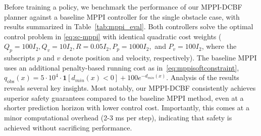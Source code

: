 \documentclass[letterpaper, 10 pt, conference]{ieeeconf}
\begin{document}
Before training a policy, we benchmark the performance of our MPPI-DCBF planner against a baseline MPPI controller for the single obstacle case, with results summarized in Table~\ref{tab:mppi_eval}. Both controllers solve the optimal control problem in \eqref{eq:sc-mppi} with identical quadratic cost weights ($Q_p=100I_2, Q_v=10I_2, R=0.05I_2, P_p=1000I_2,$ and $P_v=100I_2$, where the subscripts $p$ and $v$ denote position and velocity, respectively). The baseline MPPI uses an additional penalty-based running cost as in~\eqref{eq:mppisoftconstraint}, $q_{\text{obs}}(x) = 5\cdot10^4 \cdot \mathbf{1}[d_{min}(x)<0] + 100 e^{-d_{min}(x)}$. Analysis of the results reveals several key insights. Most notably, our MPPI-DCBF consistently achieves superior safety guarantees compared to the baseline MPPI method, even at a shorter prediction horizon with lower control cost. Importantly, this comes at a minor computational overhead (2-3 ms per step), indicating that safety is achieved without sacrificing performance.
\end{document}
